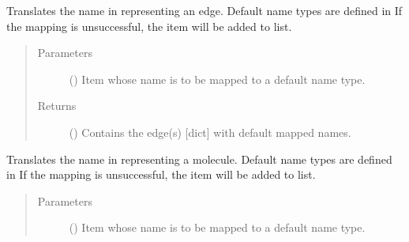 \documentclass[letterpaper,10pt,english]{sphinxmanual}
\begin{document}
\begin{fulllineitems}
\begin{fulllineitems}
\begin{quote}
\begin{description}
\begin{itemize}
\end{itemize}


\end{description}\end{quote}

\end{fulllineitems}


\begin{fulllineitems}
\label{\detokenize{main:pypath.main.PyPath.loop_edges}}
\end{fulllineitems}


\begin{fulllineitems}
\label{\detokenize{main:pypath.main.PyPath.map_edge}}
Translates the name in  representing an edge. Default
name types are defined in
 If the mapping
is unsuccessful, the item will be added to
 list.
\begin{quote}\begin{description}
\item[{Parameters}] \leavevmode
{} () \textendash{} Item whose name is to be mapped to a default name type.

\item[{Returns}] \leavevmode
() \textendash{} Contains the edge(s) {[}dict{]} with default mapped
names.

\end{description}\end{quote}

\end{fulllineitems}


\begin{fulllineitems}
\label{\detokenize{main:pypath.main.PyPath.map_item}}
Translates the name in  representing a molecule. Default
name types are defined in
 If the mapping
is unsuccessful, the item will be added to
 list.
\begin{quote}\begin{description}
\item[{Parameters}] \leavevmode
{} () \textendash{} Item whose name is to be mapped to a default name type.


\end{description}
\end{quote}
\end{fulllineitems}
\end{fulllineitems}
\end{document}
